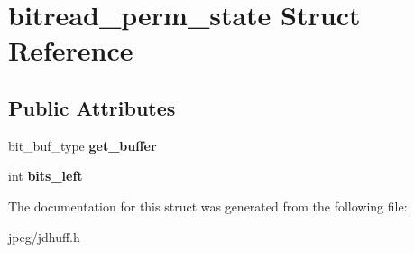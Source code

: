 \hypertarget{structbitread__perm__state}{}\section{bitread\+\_\+perm\+\_\+state Struct Reference}
\label{structbitread__perm__state}
\subsection*{Public Attributes}
\begin{DoxyCompactItemize}
\item 
bit\+\_\+buf\+\_\+type {\bfseries get\+\_\+buffer}\hypertarget{structbitread__perm__state_a39dce6ef08822b3ae5c8ba2329d079bd}{}\label{structbitread__perm__state_a39dce6ef08822b3ae5c8ba2329d079bd}

\item 
int {\bfseries bits\+\_\+left}\hypertarget{structbitread__perm__state_ac138b781f4681902dec2e44007f672c4}{}\label{structbitread__perm__state_ac138b781f4681902dec2e44007f672c4}

\end{DoxyCompactItemize}


The documentation for this struct was generated from the following file\+:\begin{DoxyCompactItemize}
\item 
jpeg/jdhuff.\+h\end{DoxyCompactItemize}
